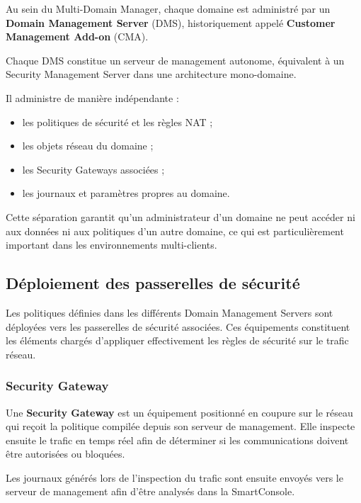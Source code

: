 Au sein du Multi-Domain Manager, chaque domaine est administré
par un \textbf{Domain Management Server} (DMS), historiquement
appelé \textbf{Customer Management Add-on} (CMA).

Chaque DMS constitue un serveur de management autonome,
équivalent à un Security Management Server dans une architecture
mono-domaine.

Il administre de manière indépendante :

\begin{itemize}
    \item les politiques de sécurité et les règles NAT ;
    \item les objets réseau du domaine ;
    \item les Security Gateways associées ;
    \item les journaux et paramètres propres au domaine.
\end{itemize}

Cette séparation garantit qu’un administrateur d’un domaine ne
peut accéder ni aux données ni aux politiques d’un autre domaine,
ce qui est particulièrement important dans les environnements
multi-clients.


\subsection{Déploiement des passerelles de sécurité}

Les politiques définies dans les différents Domain Management
Servers sont déployées vers les passerelles de sécurité
associées. Ces équipements constituent les éléments chargés
d’appliquer effectivement les règles de sécurité sur le trafic
réseau.

\subsubsection{Security Gateway}

Une \textbf{Security Gateway} est un équipement positionné en
coupure sur le réseau qui reçoit la politique compilée depuis
son serveur de management. Elle inspecte ensuite le trafic en
temps réel afin de déterminer si les communications doivent être
autorisées ou bloquées.

Les journaux générés lors de l'inspection du trafic sont
ensuite envoyés vers le serveur de management afin d’être
analysés dans la SmartConsole.

